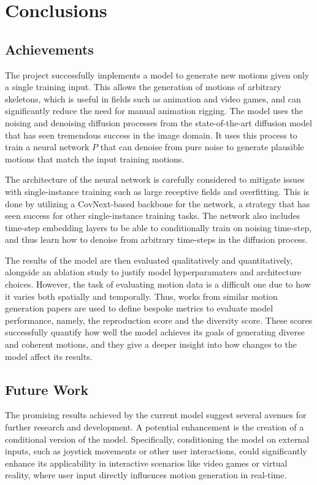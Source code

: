 \documentclass[a4paper, 12pt]{report}
\begin{document}
\chapter{Conclusions}
\section{Achievements}
The project successfully implements a model to generate new motions given only a single training input. This allows the generation of motions of arbitrary skeletons, which is useful in fields such as animation and video games, and can significantly reduce the need for manual animation rigging. The model uses the noising and denoising diffusion processes from the state-of-the-art diffusion model that has seen tremendous success in the image domain. It uses this process to train a neural network \(P\) that can denoise from pure noise to generate plausible motions that match the input training motions. 

The architecture of the neural network is carefully considered to mitigate issues with single-instance training such as large receptive fields and overfitting. This is done by utilizing a CovNext-based backbone for the network, a strategy that has seen success for other single-instance training tasks. The network also includes time-step embedding layers to be able to conditionally train on noising time-step, and thus learn how to denoise from arbitrary time-steps in the diffusion process.

The results of the model are then evaluated qualitatively and quantitatively, alongside an ablation study to justify model hyperparamaters and architecture choices. However, the task of evaluating motion data is a difficult one due to how it varies both spatially and temporally. Thus, works from similar motion generation papers are used to define bespoke metrics to evaluate model performance, namely, the reproduction score and the diversity score. These scores successfully quantify how well the model achieves its goals of generating diverse and coherent motions, and they give a deeper insight into how changes to the model affect its results.

\section{Future Work}
The promising results achieved by the current model suggest several avenues for further research and development. A potential enhancement is the creation of a conditional version of the model. Specifically, conditioning the model on external inputs, such as joystick movements or other user interactions, could significantly enhance its applicability in interactive scenarios like video games or virtual reality, where user input directly influences motion generation in real-time.
\end{document}

